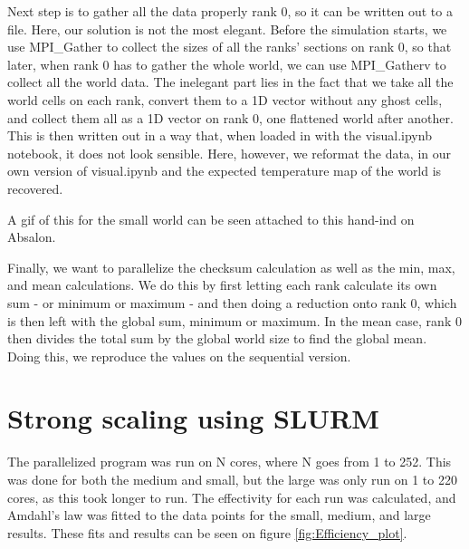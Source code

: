 \documentclass{article}
\begin{document}
Next step is to gather all the data properly rank 0, so it can be written out to a file. Here, our solution is not the most elegant. Before the simulation starts, we use MPI\_Gather to collect the sizes of all the ranks' sections on rank 0, so that later, when rank 0 has to gather the whole world, we can use MPI\_Gatherv to collect all the world data. The inelegant part lies in the fact that we take all the world cells on each rank, convert them to a 1D vector without any ghost cells, and collect them all as a 1D vector on rank 0, one flattened world after another. This is then written out in a way that, when loaded in with the visual.ipynb notebook, it does not look sensible. Here, however, we reformat the data, in our own version of visual.ipynb and the expected temperature map of the world is recovered. 

A gif of this for the small world can be seen attached to this hand-ind on Absalon.

Finally, we want to parallelize the checksum calculation as well as the min, max, and mean calculations. We do this by first letting each rank calculate its own sum - or minimum or maximum - and then doing a reduction onto rank 0, which is then left with the global sum, minimum or maximum. In the mean case, rank 0 then divides the total sum by the global world size to find the global mean. Doing this, we reproduce the values on the sequential version.


\section{Strong scaling using SLURM}
The parallelized program was run on N cores, where N goes from 1 to 252. This was done for both the medium and small, but the large was only run on 1 to 220 cores, as this took longer to run. The effectivity for each run was calculated, and Amdahl's law was fitted to the data points for the small, medium, and large results.
These fits and results can be seen on figure \ref{fig:Efficiency_plot}. 
\end{document}
